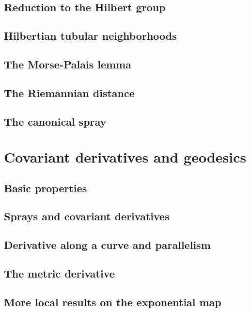 \documentclass[a4paper]{article}
\begin{document}
\subsection{Reduction to the Hilbert group}

\subsection{Hilbertian tubular neighborhoods}

\subsection{The Morse-Palais lemma}

\subsection{The Riemannian distance}

\subsection{The canonical spray}

\section{Covariant derivatives and geodesics}

\subsection{Basic properties}

\subsection{Sprays and covariant derivatives}

\subsection{Derivative along a curve and parallelism}

\subsection{The metric derivative}

\subsection{More local results on the exponential map}
\end{document}
